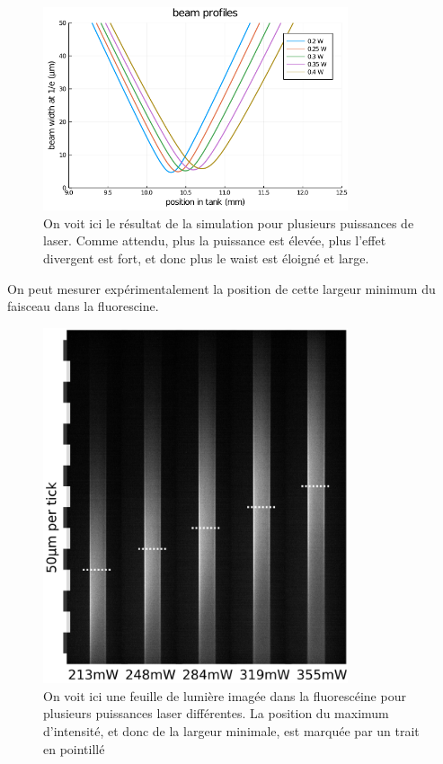 \begin{figure}
\centering
\includegraphics[width=0.8\textwidth]{./files/grinlensplots_profile.png}
\caption{
On voit ici le résultat de la simulation pour plusieurs puissances de laser. Comme attendu, plus la puissance est élevée, plus l'effet divergent est fort, et donc plus le waist est éloigné et large.
}
\end{figure}

On peut mesurer expérimentalement la position de cette largeur minimum du faisceau dans la fluorescine.

\begin{figure}
\centering
\includegraphics[width=0.8\textwidth]{./files/thermal-shift.svg.png}
\caption{
On voit ici une feuille de lumière imagée dans la fluorescéine pour plusieurs puissances laser différentes. La position du maximum d'intensité, et donc de la largeur minimale, est marquée par un trait en pointillé
}
\end{figure}

